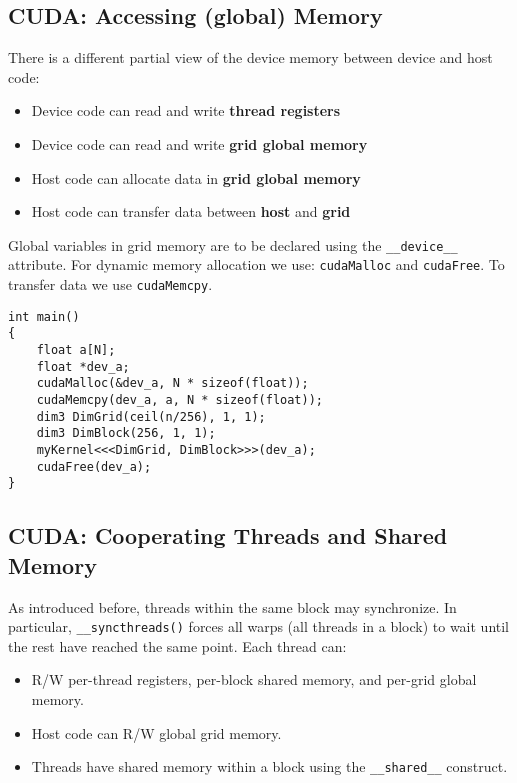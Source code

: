 \subsection{CUDA: Accessing (global) Memory}
There is a different partial view of the device memory between device and host code:
\begin{multicols}{2}
    \begin{itemize}
        \item Device code can read and write \textbf{thread registers}
        \item Device code can read and write \textbf{grid global memory}
        \item Host code can allocate data in \textbf{grid global memory}
        \item Host code can transfer data between \textbf{host} and \textbf{grid}
    \end{itemize}
\end{multicols}
Global variables in grid memory are to be declared using the \texttt{\_\_device\_\_} attribute.
For dynamic memory allocation we use: \texttt{cudaMalloc} and \texttt{cudaFree}.
To transfer data we use \texttt{cudaMemcpy}.
\begin{lstlisting}[style=cuda,caption={Example of a kernel definition and call.}]
int main()
{
    float a[N];
    float *dev_a;
    cudaMalloc(&dev_a, N * sizeof(float));
    cudaMemcpy(dev_a, a, N * sizeof(float));
    dim3 DimGrid(ceil(n/256), 1, 1);
    dim3 DimBlock(256, 1, 1);
    myKernel<<<DimGrid, DimBlock>>>(dev_a);
    cudaFree(dev_a);
}
\end{lstlisting}

\subsection{CUDA: Cooperating Threads and Shared Memory}

As introduced before, threads within the same block may synchronize.
In particular, \texttt{\_\_syncthreads()} forces all warps (all threads in a block) to wait until the rest have reached the same point.
Each thread can:
\begin{itemize}
    \item R/W per-thread registers, per-block shared memory, and per-grid global memory.
    \item Host code can R/W global grid memory.
    \item Threads have shared memory within a block using the \texttt{\_\_shared\_\_} construct.
\end{itemize}
